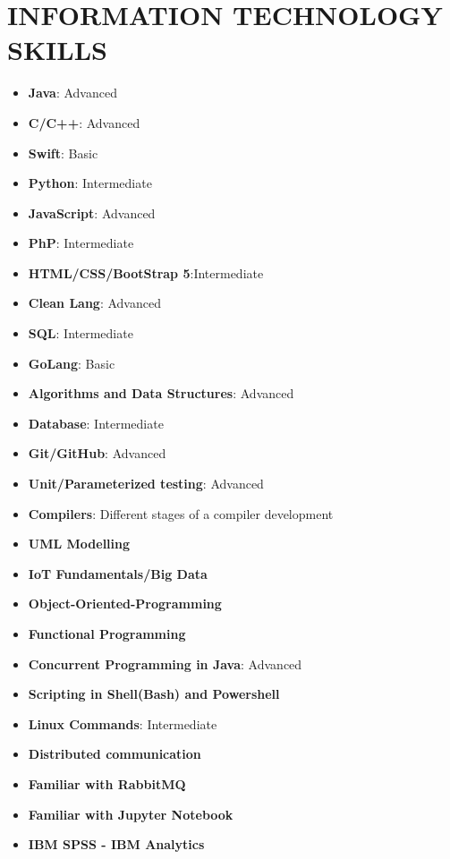 \documentclass[11 pt,oneside,a4paper,titlepage]{article}
\begin{document}
{\begin{minipage}{11.3cm}
        \section*{{\faCode} INFORMATION TECHNOLOGY SKILLS}
        \vspace*{-0.5cm}
        \hfill \break
        \begin{multicols}{2}    
        \begin{itemize}
        \footnotesize
            \item \textbf{Java}: Advanced
            \item \textbf{C/C++}: Advanced
            \item \textbf{Swift}: Basic
            \item \textbf{Python}: Intermediate
            \item \textbf{JavaScript}: Advanced
            \item \textbf{PhP}: Intermediate
            \item \textbf{HTML/CSS/BootStrap 5}:Intermediate
            \item \textbf{Clean Lang}: Advanced
            \item \textbf{SQL}: Intermediate
            \item \textbf{GoLang}: Basic
            \item \textbf{Algorithms and Data Structures}: Advanced
            \item \textbf{Database}: Intermediate
            \item \textbf{Git/GitHub}: Advanced
            \item \textbf{Unit/Parameterized testing}: Advanced
            \item \textbf{Compilers}: Different stages of a compiler development
            \item \textbf{UML Modelling}
            \item \textbf{IoT Fundamentals/Big Data}
            \item \textbf{Object-Oriented-Programming}
            \item \textbf{Functional Programming}
            \item \textbf{Concurrent Programming in Java}: Advanced
            \item \textbf{Scripting in Shell(Bash) and Powershell}
            \item \textbf{Linux Commands}: Intermediate 
            \item \textbf{Distributed communication}
            \item \textbf{Familiar with RabbitMQ}
            \item \textbf{Familiar with Jupyter Notebook}
            \item \textbf{IBM SPSS - IBM Analytics}
            

\end{itemize}
\end{multicols}
\end{minipage}}
\end{document}
